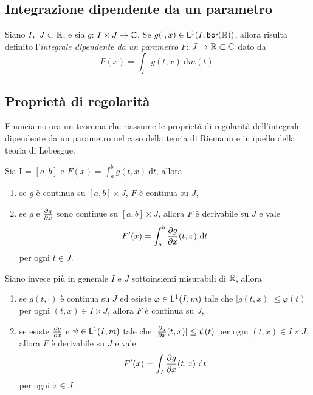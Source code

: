 \documentclass[Completo.tex]{subfiles}
\begin{document}
\subsection{Integrazione dipendente da un parametro}
Siano $I, \ J \sset \bb[R]$, e sia $g$: $I \times J \ra \bb[C]$. Se $g(\cdot, x) \in \sf[L]^1(I, \sf[bor](\bb[R]))$, allora risulta definito l'\textit{integrale dipendente da un parametro} $F$: $J \ra \bb[R] \sset \bb[C]$ dato da
\begin{equation*}
F(x) = \int_I g(t,x) \ \mathrm{d}m(t).
\end{equation*}
\subsection{Proprietà di regolarità}
Enunciamo ora un teorema che riassume le proprietà di regolarità dell'integrale dipendente da un parametro nel caso della teoria di Riemann e in quello della teoria di Lebesgue:
\begin{eTh}
	Sia I = $[a,b]$ e $F(x) = \int_{a}^{b} g(t,x) \ \mathrm{d}t$, allora
	\begin{enumerate}
		\item se $g$ è continua su $[a,b] \times J$, $F$ è continua su $J$,
		\item se $g$ e $\frac{\partial g}{\partial x}$ sono continue su $[a,b] \times J$, allora $F$ è derivabile su $J$ e vale
		\begin{equation*}
		F'(x) = \int_{a}^{b} \frac{\partial g}{\partial x}(t,x) \ \mathrm{d}t
		\end{equation*}
		per ogni $t \in J$.
	\end{enumerate}
	Siano invece più in generale $I$ e $J$ sottoinsiemi misurabili di $\bb[R]$, allora
	\begin{enumerate}
		\item se $g(t, \cdot)$ è continua su $J$ ed esiste $\varphi \in \sf[L]^1(I, m)$ tale che $\vert g(t,x) \vert \leq \varphi(t)$ per ogni $(t,x) \in I \times J$, allora $F$ è continua su $J$,
		\item se esiste $\frac{\partial g}{\partial x}$ e $\psi \in \sf[L]^1(I, m)$ tale che $\vert \frac{\partial g}{\partial x}(t,x) \vert \leq \psi(t)$ per ogni $(t,x) \in I \times J$, allora $F$ è derivabile su $J$ e vale
		\begin{equation*}
		F'(x) = \int_I \frac{\partial g}{\partial x}(t,x) \ \mathrm{d}t
		\end{equation*}
		per ogni $x \in J$.
	\end{enumerate}
\end{eTh}
\end{document}
